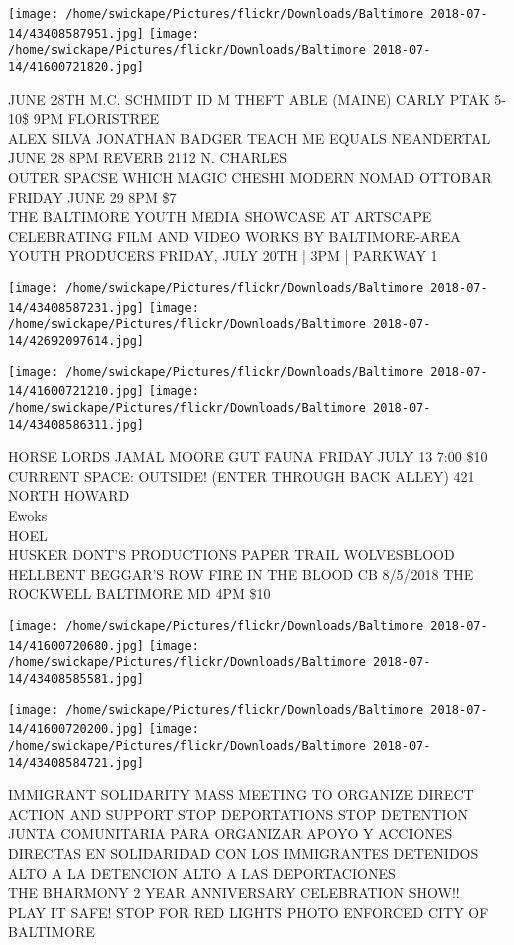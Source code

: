 \documentclass[10pt,letterpaper]{article}
\begin{document}
\texttt{[image: /home/swickape/Pictures/flickr/Downloads/Baltimore 2018-07-14/43408587951.jpg]}
\texttt{[image: /home/swickape/Pictures/flickr/Downloads/Baltimore 2018-07-14/41600721820.jpg]}

JUNE 28TH M.C. SCHMIDT ID M THEFT ABLE (MAINE) CARLY PTAK 5{-}10\$ 9PM FLORISTREE\\
ALEX SILVA JONATHAN BADGER TEACH ME EQUALS NEANDERTAL JUNE 28 8PM REVERB 2112 N. CHARLES\\
OUTER SPACSE WHICH MAGIC CHESHI MODERN NOMAD OTTOBAR FRIDAY JUNE 29 8PM \$7\\
THE BALTIMORE YOUTH MEDIA SHOWCASE AT ARTSCAPE CELEBRATING FILM AND VIDEO WORKS BY BALTIMORE{-}AREA YOUTH PRODUCERS FRIDAY, JULY 20TH | 3PM | PARKWAY 1
\pagebreak

\texttt{[image: /home/swickape/Pictures/flickr/Downloads/Baltimore 2018-07-14/43408587231.jpg]}
\texttt{[image: /home/swickape/Pictures/flickr/Downloads/Baltimore 2018-07-14/42692097614.jpg]}

\texttt{[image: /home/swickape/Pictures/flickr/Downloads/Baltimore 2018-07-14/41600721210.jpg]}
\texttt{[image: /home/swickape/Pictures/flickr/Downloads/Baltimore 2018-07-14/43408586311.jpg]}

HORSE LORDS JAMAL MOORE GUT FAUNA FRIDAY JULY 13 7:00 \$10 CURRENT SPACE: OUTSIDE!  (ENTER THROUGH BACK ALLEY) 421 NORTH HOWARD\\
Ewoks\\
HOEL\\
HUSKER DONT'S PRODUCTIONS PAPER TRAIL WOLVESBLOOD HELLBENT BEGGAR'S ROW FIRE IN THE BLOOD CB 8/5/2018 THE ROCKWELL BALTIMORE MD 4PM \$10
\pagebreak

\texttt{[image: /home/swickape/Pictures/flickr/Downloads/Baltimore 2018-07-14/41600720680.jpg]}
\texttt{[image: /home/swickape/Pictures/flickr/Downloads/Baltimore 2018-07-14/43408585581.jpg]}

\texttt{[image: /home/swickape/Pictures/flickr/Downloads/Baltimore 2018-07-14/41600720200.jpg]}
\texttt{[image: /home/swickape/Pictures/flickr/Downloads/Baltimore 2018-07-14/43408584721.jpg]}

IMMIGRANT SOLIDARITY MASS MEETING TO ORGANIZE DIRECT ACTION AND SUPPORT STOP DEPORTATIONS STOP DETENTION\\
JUNTA COMUNITARIA PARA ORGANIZAR APOYO Y ACCIONES DIRECTAS EN SOLIDARIDAD CON LOS IMMIGRANTES DETENIDOS ALTO A LA DETENCION ALTO A LAS DEPORTACIONES\\
THE BHARMONY 2 YEAR ANNIVERSARY CELEBRATION SHOW!!\\
PLAY IT SAFE!  STOP FOR RED LIGHTS PHOTO ENFORCED CITY OF BALTIMORE
\pagebreak
\end{document}
